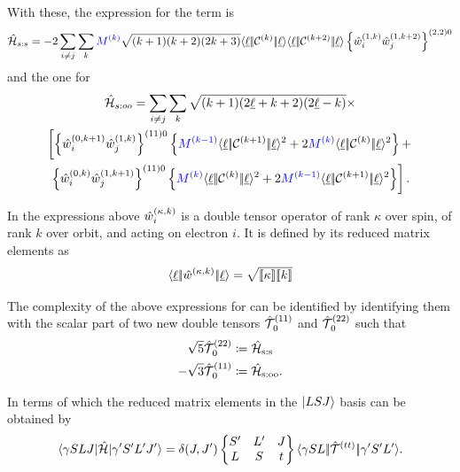 \documentclass{article}
\begin{document}
    With these, the expression for the \spinspin term is \cite{judd_intra-atomic_1968}
    \begin{multline}
    \hat{\mathcal{H}}_{s:s} = -2 \sum_{i\neq{j}}
        \sum_k \textcolor{blue}{M^{(k)}}
            \sqrt{(k+1)(k+2)(2k+3)} 
            \langle \underbar{$\ell$}|\!|\mathcal{C}^{(k)}|\!|\underbar{$\ell$}\rangle 
            \langle \underbar{$\ell$}|\!|\mathcal{C}^{(k+2)}|\!|\underbar{$\ell$}\rangle
            \left\{
                \hat{w}_{i}^{({1},{k})}
                \hat{w}_{j}^{({1},{k+2})}
            \right\}^{(2,2)0}
    \end{multline}
    and the one for \soo 
    \begin{multline}
        \ham_{s:oo} = \sum_{i\neq{j}} 
            \sum_k 
                \sqrt{(k+1)(2\lorb+k+2)(2\lorb-k)}  \times \\ 
        \left[ \left\{ \wdouble{i}{0}{k+1} \wdouble{j}{1}{k} \right\}^{(11)0} 
        \left\{ \Mk{k-1}
            \redbraopket{\lorb}
                {\Ck{k+1}}
                {\lorb}^2
            +
            2 \Mk{k} \redbraopket{\lorb}{\Ck{k}}{\lorb}^2
        \right\} + \right. \\
        \left.
            \left\{ \wdouble{i}{0}{k}\wdouble{j}{1}{k+1} \right\}^{(11)0} 
                \left\{ \Mk{k} 
                    \redbraopket{\lorb}{\Ck{k}}{\lorb}^2
                    + 2 \Mk{k-1}
                    \redbraopket{\lorb}{\Ck{k+1}}{\lorb}^2
                \right\}
        \right].
    \end{multline} 

    In the expressions above $\hat{w}_{i}^{({\kappa},{k})}$ is a double tensor operator of rank $\kappa$ over spin, of rank $k$ over orbit, and acting on electron $i$. It is defined by its reduced matrix elements as
    \begin{equation} 
    \langle \underbar{$\ell$}|\!|\hat{w}_{}^{({\kappa},{k})}|\!|\underbar{$\ell$}\rangle
        = \sqrt{[\![\kappa]\!]
            [\![k]\!]
        }
    \end{equation} 

    The complexity of the above expressions for can be identified by identifying them with the scalar part of two new double tensors $\hat{\mathcal{T}}^{(11)}_{\,0}$ and $\hat{\mathcal{T}}^{(22)}_{\,0}$ such that
    \begin{align}
    \sqrt{5}\hat{\mathcal{T}}^{(22)}_{\,0} &\coloneqq \hat{\mathcal{H}}_{\text{s:s}} \\
    -\sqrt{3}\hat{\mathcal{T}}^{(11)}_{\,0} &\coloneqq \hat{\mathcal{H}}_\text{s:oo}.
    \end{align}

    In terms of which the reduced matrix elements in the $|LSJ\rangle$ basis can be obtained by
    \begin{equation}
        \langle \gamma{SLJ}|\hat{\mathcal{H}}|\gamma'{S'L'J'}\rangle = \delta(J,J') \begin{Bmatrix} S' & L' & J \\ L & S & t \end{Bmatrix} \langle \gamma{SL}|\!|\hat{\mathcal{T}}^{(tt)}_{\,}|\!|\gamma'{S'L'}\rangle.
    \label{SLtoSLJ for Ttt}
    \end{equation}
\end{document}
